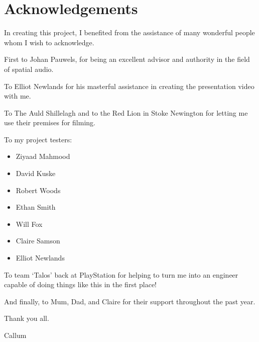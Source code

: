 \thispagestyle{plain}
\newpage
\appendix
\section{Acknowledgements}\label{sec:acknowledgements}

\normalsize

In creating this project, I benefited from the assistance of many wonderful people whom I wish to acknowledge.

First to Johan Pauwels, for being an excellent advisor and authority in the field of spatial audio.

To Elliot Newlands for his masterful assistance in creating the presentation video with me.

To The Auld Shillelagh and to the Red Lion in Stoke Newington for letting me use their premises for filming.

To my project testers:

\begin{itemize}
    \item Ziyaad Mahmood
    \item David Kuske
    \item Robert Woods
    \item Ethan Smith
    \item Will Fox
    \item Claire Samson
    \item Elliot Newlands
\end{itemize}

To team `Talos'
back at PlayStation for helping to turn me into an engineer capable of doing things like this in the first place!

And finally, to Mum, Dad, and Claire for their support throughout the past year.

Thank you all.

Callum